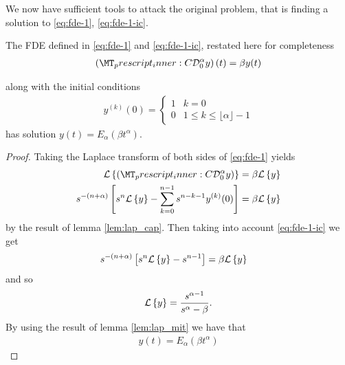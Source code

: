 \documentclass{article}
\begin{document}
We now have sufficient tools to attack the original problem, that is finding a solution to \eqref{eq:fde-1}, \eqref{eq:fde-1-ic}.

\begin{lemma}
	The FDE defined in \eqref{eq:fde-1} and \eqref{eq:fde-1-ic}, restated here for completeness 
	\begin{align*}
		\left( \prescript{C}{}{\mathcal{D}_0^\alpha}y \right)(t) = \beta y(t) 
	\end{align*}

	along with the initial conditions 
	\begin{align*}
		y^{(k)}(0) = 
		\begin{cases}
			1 & k = 0 \\
			0 & 1 \leq k \leq \lfloor \alpha \rfloor - 1  
		\end{cases}
	\end{align*}
	has solution $ y(t) = E_\alpha \left( \beta t^\alpha \right) $.
\end{lemma}
\begin{proof}
	Taking the Laplace transform of both sides of \eqref{eq:fde-1} yields
	\begin{align*}
		\laplace{\capder{0}{\alpha}{y}} &= \beta \laplace{y} \\
		s^{-(n+\alpha)} \left[s^n \laplace{y} - \sum_{k=0}^{n-1} s^{n-k-1} y^{(k)}(0) \right] &= \beta \laplace{y}
	\end{align*}
	by the result of lemma \ref{lem:lap_cap}. 
	Then taking into account \eqref{eq:fde-1-ic} we get
	\begin{align*}
		s^{-(n+\alpha)} \left[s^n \mathcal{L} \left\{ y \right\} - s^{n-1}\right] &= \beta \mathcal{L} \left\{ y \right\}
	\end{align*}
	and so 
	\begin{align*}
		\mathcal{L} \left\{ y \right\} = \frac{s^{\alpha-1}}{s^\alpha - \beta}.
	\end{align*}
	By using the result of lemma \ref{lem:lap_mit} we have that 
	\begin{align*}
		y(t) = E_\alpha(\beta t^\alpha)
	\end{align*}
\end{proof}





\end{document}
